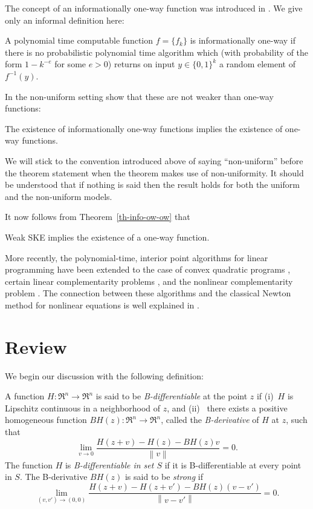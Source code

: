 \documentclass[mlq,fleqn]{w-art}
\newcommand{\thmref}[1]{Theorem~\ref{#1}}
\newcommand{\enVert}[1]{\left\lVert#1\right\rVert}
\begin{document}
The concept of an informationally one-way function was introduced
in \cite{imlelu:oneway}. We give only an informal definition here:

\begin{defn} A polynomial time
computable function $f = \{f_k\}$ is informationally
one-way if there is no probabilistic polynomial time algorithm which
(with probability of the form $1 - k^{-e}$ for some $e > 0$)
returns on input $y \in \{0,1\}^{k}$ a random element of $f^{-1}(y)$.
\end{defn}
In the non-uniform setting \cite{imlelu:oneway} show that these are not
weaker than one-way functions:
\begin{thm}
\label{th-info-ow-ow}
The existence of informationally one-way functions
implies the existence of one-way functions.
\end{thm}
We will stick to the convention introduced above of saying
``non-uniform'' before the theorem statement when the theorem
makes use of non-uniformity. It should be understood that
if nothing is said then the result holds for both the uniform and
the non-uniform models.

It now follows from \thmref{th-info-ow-ow} that

\begin{thm}\label{th-weak-ske-owf} Weak SKE
implies the existence of a one-way function.
\end{thm}

More recently, the polynomial-time, interior point algorithms for linear
programming have been extended to the case of convex quadratic programs
\cite{moad:quadpro,ye:intalg}, certain linear complementarity problems
\cite{komiyo:lincomp,miyoki:lincomp}, and the nonlinear complementarity
problem \cite{komiyo:unipfunc}. The connection between these algorithms
and the classical Newton method for nonlinear equations is well
explained in \cite{komiyo:lincomp}.

\section{Review}
\label{computation}

We begin our discussion with the following definition:

\begin{defn}

A function $H\colon \Re^n \to \Re^n$ is said to be
\emph{B-differentiable} at the point $z$ if (i)~$H$ is Lipschitz
continuous in a neighborhood of $z$, and (ii)~ there exists a positive
homogeneous function $BH(z)\colon \Re^n \to \Re^n$, called the
\emph{B-derivative} of $H$ at $z$, such that
\[ \lim_{v \to 0} \frac{H(z+v) - H(z) - BH(z)v}{\enVert{v}} = 0. \]
The function $H$ is \textit{B-differentiable in set $S$} if it is
B-differentiable at every point in $S$. The B-derivative $BH(z)$ is said
to be \textit{strong} if
\[ \lim_{(v,v') \to (0,0)} \frac{H(z+v) - H(z+v') - BH(z)(v
 -v')}{\enVert{v - v'}} = 0. \]
\end{defn}
\end{document}

